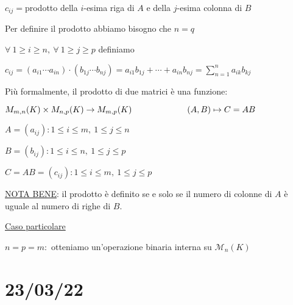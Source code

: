 \documentclass{article}
\newcommand{\ul}[1]{\underline{#1}}
\newcommand{\M}{\mathcal{M}}
\begin{document}
{\begin{itemize}
		      $c_{ij}=$prodotto della $i$-esima riga di $A$ e della $j$-esima colonna di $B$

		      Per definire il prodotto abbiamo bisogno che $n=q$

		      $\forall\ 1\ge i\ge n,\ \forall\ 1\ge j\ge p$ definiamo

		      $c_{ij}=(a_{i1}\cdots a_{in})\cdot(b_{1j}\cdots b_{nj})=a_{i1}b_{1j}+\cdots+a_{in}b_{nj}=\sum^n_{n=1}{a_{ik}b_{kj}}$

		      Più formalmente, il prodotto di due matrici è una funzione:

		      $M_{m,n}(K)\times M_{n,p}(K)\rightarrow M_{m,p}(K)\\\hspace*{6.5em}(A,B)\mapsto C=AB$

		      $A=(a_{ij}): 1\le i\le m,\ 1\le j\le n$

		      $B=(b_{ij}): 1\le i\le n,\ 1\le j\le p$

		      $C=AB=(c_{ij}): 1\le i\le m,\ 1\le j\le p$

		      \ul{NOTA BENE}: il prodotto è definito se e solo se il numero di colonne di $A$ è uguale al numero di righe di $B$.

		      \ul{Caso particolare}

		      $n=p=m:$ otteniamo un'operazione binaria interna su $\M_n(K)$
	\end{itemize}
	}
	\section{23/03/22}
\end{document}
